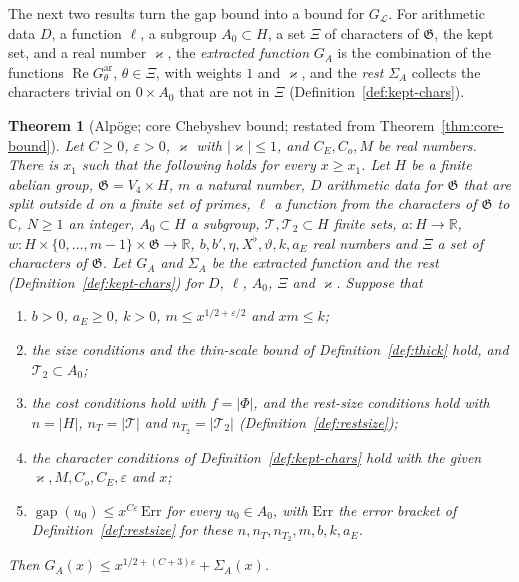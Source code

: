 \documentclass[11pt]{amsbook}
\theoremstyle{plain}
\newtheorem{theorem}{Theorem}[section]
\theoremstyle{definition}
\theoremstyle{remark}
\numberwithin{equation}{section}
\numberwithin{figure}{chapter}
\numberwithin{table}{chapter}
\newcommand{\R}{\mathbb{R}}
\renewcommand{\C}{\mathbb{C}}
\newcommand{\eps}{\varepsilon}
\newcommand{\lev}{\mathscr{L}}
\newcommand{\GG}{\mathfrak{G}}
\newcommand{\GPsi}{G^{\mathrm{ar}}}
\newcommand{\Top}{\mathcal{T}}
\newcommand{\gap}{\operatorname{gap}}
\newcommand{\Err}{\mathrm{Err}}
\begin{document}
The next two results turn the gap bound into a bound for $G_\lev$.
For arithmetic data $D$, a function $\ell$, a subgroup
$A_0\subset H$, a set $\Xi$ of characters of $\GG$, the kept set, and
a real number $\varkappa$, the \emph{extracted function} $G_A$ is the
combination of the functions $\operatorname{Re}\GPsi_\theta$,
$\theta\in\Xi$, with weights $1$ and $\varkappa$, and the \emph{rest}
$\Sigma_A$ collects the characters trivial on $0\times A_0$ that are
not in $\Xi$ (Definition~\ref{def:kept-chars}).

\begin{theorem}[Alp\"oge; core Chebyshev bound; restated from
Theorem~\ref{thm:core-bound}]
\label{bb:core-bound}
Let $C\ge0$, $\eps>0$, $\varkappa$ with $|\varkappa|\le1$, and $C_E,C_o,M$ be
real
numbers. There is $x_1$ such that the following holds for every
$x\ge x_1$. Let $H$ be a finite abelian group, $\GG=V_4\times H$, $m$ a
natural number, $D$ arithmetic data for $\GG$ that are split outside
$d$ on a finite set of primes, $\ell$ a function from the characters
of $\GG$ to $\C$, $N\ge1$ an integer, $A_0\subset H$ a subgroup,
$\Top,\Top_2\subset H$ finite sets, $a\colon H\to\R$,
$w\colon H\times\{0,\dots,m-1\}\times\GG\to\R$,
$b,b',\eta,X^\flat,\vartheta,k,a_E$ real numbers and $\Xi$ a set of
characters of $\GG$. Let $G_A$ and $\Sigma_A$ be the extracted
function and the rest (Definition~\ref{def:kept-chars}) for $D$,
$\ell$, $A_0$, $\Xi$ and $\varkappa$. Suppose that
\begin{enumerate}[label=(\roman*)]
\item $b>0$, $a_E\ge0$, $k>0$, $m\le x^{1/2+\eps/2}$ and $xm\le k$;
\item the size conditions and the thin-scale bound of
Definition~\ref{def:thick} hold, and $\Top_2\subset A_0$;
\item the cost conditions hold with $f=|\Phi|$, and the rest-size
conditions hold with $n=|H|$, $n_T=|\Top|$ and $n_{T_2}=|\Top_2|$
(Definition~\ref{def:restsize});
\item the character conditions of Definition~\ref{def:kept-chars} hold
with the given $\varkappa,M,C_o,C_E,\eps$ and $x$;
\item $\gap(u_0)\le x^{C\eps}\,\Err$ for every $u_0\in A_0$, with
$\Err$ the error bracket of Definition~\ref{def:restsize} for these
$n,n_T,n_{T_2},m,b,k,a_E$.
\end{enumerate}
Then $G_A(x)\le x^{1/2+(C+3)\eps}+\Sigma_A(x)$.
\end{theorem}
\end{document}
